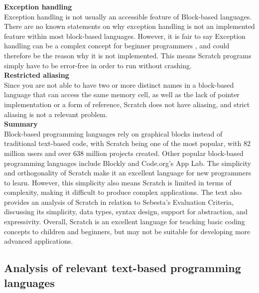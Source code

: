 \noindent\textbf{Exception handling}\\
\noindent Exception handling is not usually an accessible feature of Block-based languages. There are no known statements on why exception handling is not an implemented feature within most block-based languages. However, it is fair to say Exception handling can be a complex concept for beginner programmers \cite{exceptionhandling}, and could therefore be the reason why it is not implemented. This means Scratch programs simply have to be error-free in order to run without crashing.\\

\newpage
\noindent\textbf{Restricted aliasing}\\
\noindent Since you are not able to have two or more distinct names in a block-based language that can access the same memory cell, as well as the lack of pointer implementation or a form of reference, Scratch does not have aliasing, and strict aliasing is not a relevant problem.\\

\noindent\textbf{Summary}\\
\noindent Block-based programming languages rely on graphical blocks instead of traditional text-based code, with Scratch being one of the most popular, with 82 million users and over 638 million projects created. Other popular block-based programming languages include Blockly and Code.org's App Lab. The simplicity and orthogonality of Scratch make it an excellent language for new programmers to learn. However, this simplicity also means Scratch is limited in terms of complexity, making it difficult to produce complex applications. The text also provides an analysis of Scratch in relation to Sebesta's Evaluation Criteria, discussing its simplicity, data types, syntax design, support for abstraction, and expressivity. Overall, Scratch is an excellent language for teaching basic coding concepts to children and beginners, but may not be suitable for developing more advanced applications.

\subsection{Analysis of relevant text-based programming languages} \label{text-basedlanguages}

